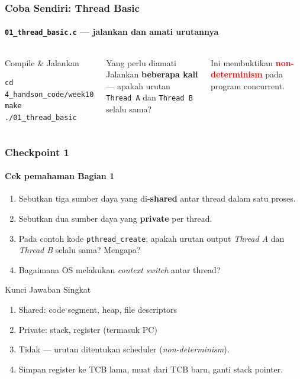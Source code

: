 \documentclass[t,aspectratio=169,xcolor=dvipsnames]{beamer}
\newcommand{\tem}[1]{\textbf{\textcolor{red}{#1}}}
\begin{document}
\begin{frame}[fragile]
    \frametitle{Coba Sendiri: Thread Basic}
    \framesubtitle{\texttt{01\_thread\_basic.c} — jalankan dan amati urutannya}
    \small

    \begin{columns}[T]
        \begin{block}{Compile \& Jalankan}
            \begin{lstlisting}[basicstyle=\ttfamily\scriptsize]
cd 4_handson_code/week10
make
./01_thread_basic
            \end{lstlisting}
        \end{block}

        \begin{exampleblock}{Yang perlu diamati}
            Jalankan \textbf{beberapa kali} — apakah urutan\\\texttt{Thread A} dan \texttt{Thread B} selalu sama?
        \end{exampleblock}

        \vspace{0.15cm}
        \footnotesize Ini membuktikan \tem{non-determinism} pada program concurrent.
    \end{columns}
\end{frame}

\begin{frame}
    \frametitle{Checkpoint 1}
    \framesubtitle{Cek pemahaman Bagian 1}
    \small

    \begin{enumerate}
        \item Sebutkan tiga sumber daya yang di-\textbf{shared} antar thread dalam satu proses.
        \item Sebutkan dua sumber daya yang \textbf{private} per thread.
        \item Pada contoh kode \texttt{pthread\_create}, apakah urutan output \textit{Thread A} dan \textit{Thread B} selalu sama? Mengapa?
        \item Bagaimana OS melakukan \textit{context switch} antar thread?
    \end{enumerate}

    \vspace{0.3cm}
    \begin{block}{Kunci Jawaban Singkat}
        \begin{enumerate}
            \item Shared: code segment, heap, file descriptors
            \item Private: stack, register (termasuk PC)
            \item Tidak — urutan ditentukan scheduler (\textit{non-determinism}).
            \item Simpan register ke TCB lama, muat dari TCB baru, ganti stack pointer.
        \end{enumerate}
    \end{block}
\end{frame}
\end{document}

